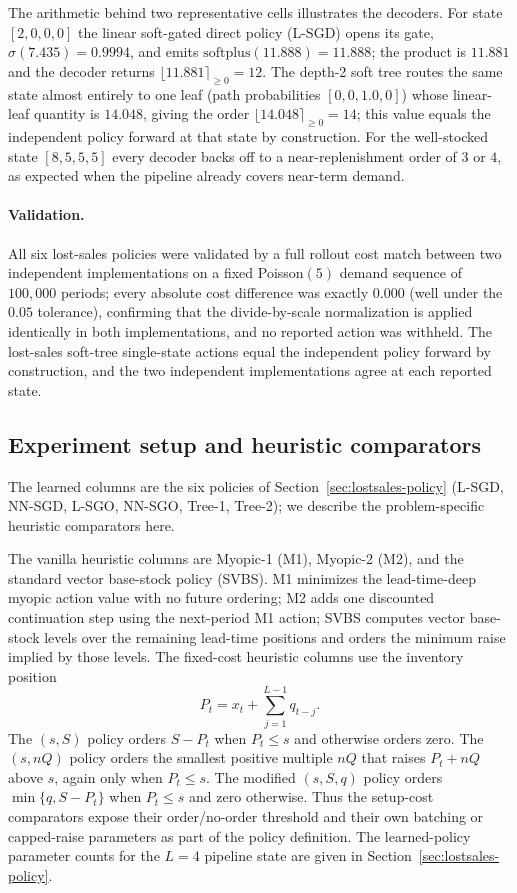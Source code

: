 \documentclass[11pt]{article}
\begin{document}
The arithmetic behind two representative cells illustrates the decoders. For state $[2,0,0,0]$ the
linear soft-gated direct policy (L-SGD) opens its gate, $\sigma(7.435)=0.9994$, and emits
$\mathrm{softplus}(11.888)=11.888$; the product is $11.881$ and the decoder returns
$\lfloor 11.881\rceil_{\ge 0}=12$. The depth-2 soft tree
routes the same state almost entirely to one leaf (path probabilities
$[0,0,1.0,0]$) whose linear-leaf quantity is $14.048$, giving the order
$\lfloor 14.048\rceil_{\ge 0}=14$; this value equals the
independent policy forward at that state by construction.
For the well-stocked state $[8,5,5,5]$ every decoder backs off to a near-replenishment order of $3$
or $4$, as expected when the pipeline already covers near-term demand.

\paragraph{Validation.}
All six lost-sales policies were validated by a full rollout cost match between two independent implementations on a fixed
Poisson$(5)$ demand sequence of $100{,}000$ periods; every absolute cost difference was exactly
$0.000$ (well under the $0.05$ tolerance), confirming that the divide-by-scale normalization is
applied identically in both implementations, and no reported action was withheld. The lost-sales
soft-tree single-state actions equal the independent policy forward by construction, and the
two independent implementations agree at each reported state.

\subsection{Experiment setup and heuristic comparators}

The learned columns are the six policies of Section~\ref{sec:lostsales-policy} (L-SGD, NN-SGD, L-SGO,
NN-SGO, Tree-1, Tree-2); we describe the problem-specific heuristic comparators here.

The vanilla heuristic columns are Myopic-1 (M1), Myopic-2 (M2), and the standard vector base-stock
policy (SVBS). M1 minimizes the lead-time-deep myopic action value with no future ordering; M2 adds
one discounted continuation step using the next-period M1 action; SVBS computes vector base-stock
levels over the remaining lead-time positions and orders the minimum raise implied by those levels.
The fixed-cost heuristic columns use the inventory position
\[
P_t=x_t+\sum_{j=1}^{L-1} q_{t-j}.
\]
The $(s,S)$ policy orders $S-P_t$ when $P_t\le s$ and otherwise orders zero. The $(s,nQ)$ policy
orders the smallest positive multiple $nQ$ that raises $P_t+nQ$ above $s$, again only when
$P_t\le s$. The modified $(s,S,q)$ policy orders $\min\{q,S-P_t\}$ when $P_t\le s$ and zero
otherwise. Thus the setup-cost comparators expose their order/no-order threshold and their own
batching or capped-raise parameters as part of the policy definition. The learned-policy parameter
counts for the $L=4$ pipeline state are given in Section~\ref{sec:lostsales-policy}.
\end{document}
